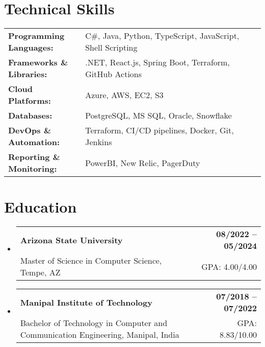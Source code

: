 \documentclass[letterpaper,11pt]{article}
\makeatletter
\newcommand{\educationSubheading}[4]{
  \vspace{-2pt}\item
    \begin{tabular*}{1.0\textwidth}[t]{l@{\extracolsep{\fill}}r}
      \textbf{\small #1} & \textbf{\small #2} \\
      {\small#3} & {\small #4} \\
    \end{tabular*}\vspace{-7pt}
}
\newcommand{\resumeSubHeadingListStart}{\begin{itemize}[leftmargin=0pt, label={}]}
\newcommand{\resumeSubHeadingListEnd}{\end{itemize}}
\makeatother
\begin{document}
\section{Technical Skills}
        \vspace{-14pt}
        \begin{table}[h]
            \footnotesize
            \begin{tabular}{p{0.3\linewidth} p{0.7\linewidth}}
                \textbf{Programming Languages:} & C\#, Java, Python, TypeScript, JavaScript, Shell Scripting \\
                \textbf{Frameworks \& Libraries:} & .NET, React.js, Spring Boot, Terraform, GitHub Actions \\
                \textbf{Cloud Platforms:} & Azure, AWS, EC2, S3 \\
                \textbf{Databases:} & PostgreSQL, MS SQL, Oracle, Snowflake \\
                \textbf{DevOps \& Automation:} & Terraform, CI/CD pipelines, Docker, Git, Jenkins \\
                \textbf{Reporting \& Monitoring:} & PowerBI, New Relic, PagerDuty \\
            \end{tabular}
        \end{table}

 \vspace{-15pt}

\section{Education}
  \resumeSubHeadingListStart
    \educationSubheading
      {Arizona State University}{08/2022 -- 05/2024}
      {Master of Science in Computer Science, Tempe, AZ}{GPA: 4.00/4.00}

    \educationSubheading
      {Manipal Institute of Technology}{07/2018 -- 07/2022}
      {Bachelor of Technology in Computer and Communication Engineering, Manipal, India}{GPA: 8.83/10.00}
  \resumeSubHeadingListEnd
\end{document}
